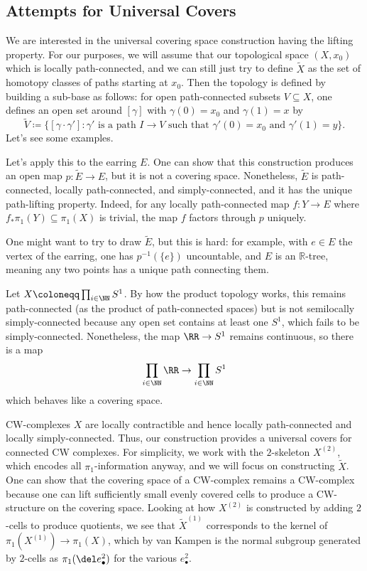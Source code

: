 \documentclass[../notes.tex]{subfiles}
\begin{document}
\subsection{Attempts for Universal Covers}
We are interested in the universal covering space construction having the lifting property. For our purposes, we will assume that our topological space $(X,x_0)$ which is locally path-connected, and we can still just try to define $\widetilde X$ as the set of homotopy classes of paths starting at $x_0$. Then the topology is defined by building a sub-base as follows: for open path-connected subsets $V\subseteq X$, one defines an open set around $[\gamma]$ with $\gamma(0)=x_0$ and $\gamma(1)=x$ by
\[\widetilde V\coloneqq\{[\gamma\cdot\gamma']:\gamma'\text{ is a path }I\to V\text{ such that }\gamma'(0)=x_0\text{ and }\gamma'(1)=y\}.\]
Let's see some examples.
\begin{example}
	Let's apply this to the earring $E$. One can show that this construction produces an open map $p\colon\widetilde E\to E$, but it is not a covering space. Nonetheless, $\widetilde E$ is path-connected, locally path-connected, and simply-connected, and it has the unique path-lifting property. Indeed, for any locally path-connected map $f\colon Y\to E$ where $f_*\pi_1(Y)\subseteq\pi_1(X)$ is trivial, the map $f$ factors through $p$ uniquely.

	One might want to try to draw $\widetilde E$, but this is hard: for example, with $e\in E$ the vertex of the earring, one has $p^{-1}(\{e\})$ uncountable, and $E$ is an $\mathbb R$-tree, meaning any two points has a unique path connecting them.
\end{example}
\begin{example}
	Let $X\coloneqq\prod_{i\in\NN}S^1$. By how the product topology works, this remains path-connected (as the product of path-connected spaces) but is not semilocally simply-connected because any open set contains at least one $S^1$, which fails to be simply-connected. Nonetheless, the map $\RR\to S^1$ remains continuous, so there is a map
	\[\prod_{i\in\NN}\RR\to\prod_{i\in\NN}S^1\]
	which behaves like a covering space.
\end{example}
\begin{example}
	CW-complexes $X$ are locally contractible and hence locally path-connected and locally simply-connected. Thus, our construction provides a universal covers for connected CW complexes. For simplicity, we work with the $2$-skeleton $X^{(2)}$, which encodes all $\pi_1$-information anyway, and we will focus on constructing $\widetilde X$. One can show that the covering space of a CW-complex remains a CW-complex because one can lift sufficiently small evenly covered cells to produce a CW-structure on the covering space. Looking at how $X^{(2)}$ is constructed by adding $2$-cells to produce quotients, we see that $\widetilde{X}^{(1)}$ corresponds to the kernel of $\pi_1(X^{(1)})\to\pi_1(X)$, which by van Kampen is the normal subgroup generated by $2$-cells as $\pi_1(\del e_\bullet^2)$ for the various $e_\bullet^2$.
\end{example}
\end{document}
